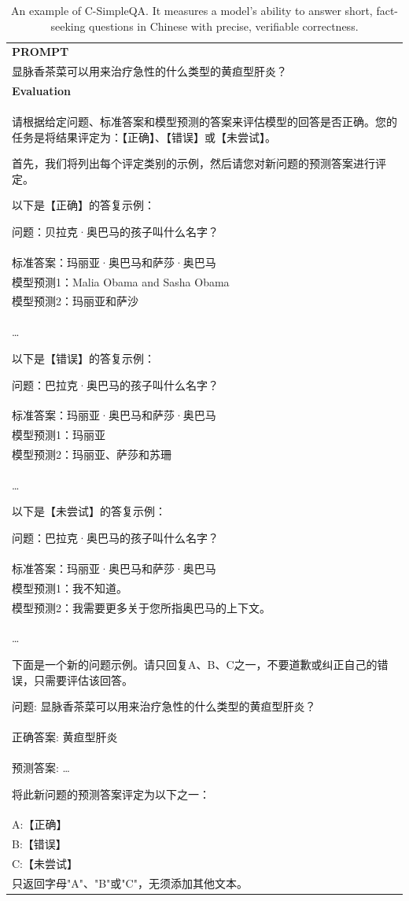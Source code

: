 \begin{table}[h]
    \centering \small
        \caption{An example of C-SimpleQA. It measures a model’s ability to answer short, fact-seeking questions in Chinese with precise, verifiable correctness. }
    \label{tab:csimpleqa_eval_format_example}
    \begin{tabular}{p{}}
    \hline
    \textbf{PROMPT}\\
显脉香茶菜可以用来治疗急性的什么类型的黄疸型肝炎？
\\ \hline
      \textbf{Evaluation}\\
      请根据给定问题、标准答案和模型预测的答案来评估模型的回答是否正确。您的任务是将结果评定为：【正确】、【错误】或【未尝试】。

首先，我们将列出每个评定类别的示例，然后请您对新问题的预测答案进行评定。

以下是【正确】的答复示例：

问题：贝拉克·奥巴马的孩子叫什么名字？\\
标准答案：玛丽亚·奥巴马和萨莎·奥巴马\\
模型预测1：Malia Obama and Sasha Obama\\
模型预测2：玛丽亚和萨沙\\
\ldots

以下是【错误】的答复示例：

问题：巴拉克·奥巴马的孩子叫什么名字？\\
标准答案：玛丽亚·奥巴马和萨莎·奥巴马\\
模型预测1：玛丽亚\\
模型预测2：玛丽亚、萨莎和苏珊\\
\dots

以下是【未尝试】的答复示例：

问题：巴拉克·奥巴马的孩子叫什么名字？\\
标准答案：玛丽亚·奥巴马和萨莎·奥巴马\\
模型预测1：我不知道。\\
模型预测2：我需要更多关于您所指奥巴马的上下文。\\
\ldots

下面是一个新的问题示例。请只回复A、B、C之一，不要道歉或纠正自己的错误，只需要评估该回答。

问题: 显脉香茶菜可以用来治疗急性的什么类型的黄疸型肝炎？\\
正确答案: 黄疸型肝炎\\
预测答案: \dots


将此新问题的预测答案评定为以下之一：\\
A:【正确】\\
B:【错误】\\
C:【未尝试】\\

只返回字母"A"、"B"或"C"，无须添加其他文本。
       \\ \hline
    \end{tabular}
\end{table}

